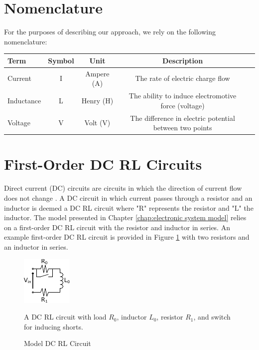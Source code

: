 \documentclass[11pt,oneside]{report}
\begin{document}
    \section{Nomenclature}
    For the purposes of describing our approach, we rely on the following nomenclature:
    
    \begin{center}
    \bgroup
    \def\arraystretch{1.0}%
    \begin{tabular}{| l | c | c | c | l |}
      \hline			
      Term & Symbol & Unit & Description\\  \hline \hline \cline{1-4}
      Current & I & Ampere (A) & The rate of electric charge flow \\ \cline{1-4}
      Inductance & L & Henry (H) & The ability to induce electromotive force (voltage)\\ \cline{1-4}
      Voltage & V & Volt (V) & The difference in electric potential between two points\\ \cline{1-4}
      \hline  
    \end{tabular}
    \egroup
    \end{center}
    
    
    
    \section{First-Order DC RL Circuits}
    Direct current (DC) circuits are circuits in which the direction of current flow does not change \cite{uniphy}. A DC circuit in which current passes through a resistor and an inductor is deemed a DC RL circuit where "R" represents the resistor and "L" the inductor. The model presented in Chapter \ref{chap:electronic system model} relies on a first-order DC RL circuit with the resistor and inductor in series. An example first-order DC RL circuit is provided in Figure \ref{fig:ModelDCRL} with two resistors and an inductor in series.
    \begin{figure}
        \centering
        \includegraphics[width=0.25\linewidth]{img/Model_DC_RL_Circuit_General.pdf}
        \caption{Model DC RL Circuit} A DC RL circuit with load $R_0$, inductor $L_0$, resistor $R_1$, and switch for inducing shorts.
        \label{fig:ModelDCRL}
    \end{figure}
\end{document}
